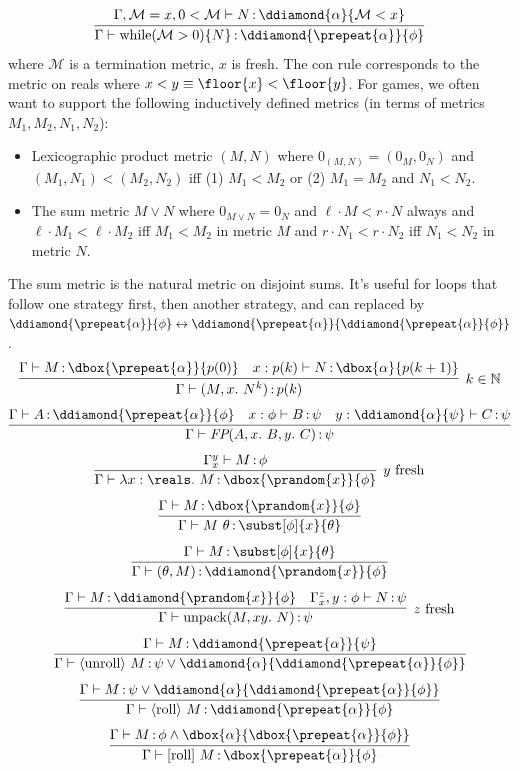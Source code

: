 \documentclass[12pt]{cmuthesis}
\theoremstyle{definition}
\theoremstyle{remark}
\newcommand{\lequiv}{\leftrightarrow}
\begin{document}
\[\infer{\proves{\G}{\ewhile{\mathcal{M}}{N}}{\ddiamond{\prepeat{\alpha}}{\phi}}}
        {\proves{\G,\mathcal{M}=x,0<\mathcal{M}}{N}{\ddiamond{\alpha}{\mathcal{M}<x}}}\]
where $\mathcal{M}$ is a termination metric, $x$ is fresh.
The con rule corresponds to the metric on reals where $x < y \equiv \floor{x} < \floor{y}$.
For games, we often want to support the following inductively defined metrics (in terms of metrics $M_1, M_2, N_1, N_2$):
\begin{itemize}
\item Lexicographic product metric $(M,N)$ where $0_{(M,N)}=(0_M,0_N)$ and $(M_1,N_1) < (M_2,N_2)$ iff (1) $M_1 < M_2$ or (2) $M_1 = M_2$ and $N_1 < N_2$.
\item The sum metric $M \lor N$ where  $0_{M \lor N} = 0_N$ and $\ell\cdot M < r\cdot N$ always and $\ell\cdot M_1 <\ell \cdot M_2$ iff $M_1 < M_2$ in metric $M$ and $r\cdot N_1 < r\cdot N_2$ iff $N_1 < N_2$ in metric $N$.
\end{itemize}
The sum metric is the natural metric on disjoint sums.
It's useful for loops that follow one strategy first, then another strategy, and can replaced by $\ddiamond{\prepeat{\alpha}}{\phi} \lequiv \ddiamond{\prepeat{\alpha}}{\ddiamond{\prepeat{\alpha}}{\phi}}$.
\[\infer[k \in \mathbb{N}]{\proves{\G}{\eloopelim{M}{N}{k}}{p(k)}}
        {\proves{\G}{M}{\dbox{\prepeat{\alpha}}{p(0)}}
        &\proves{x:p(k)}{N}{\dbox{\alpha}{p(k+1)}}}\]
\[\infer{\proves{\G}{\efp{A}{B}{C}}{\psi}}
        {\proves{\G}{A}{\ddiamond{\prepeat{\alpha}}{\phi}} 
        &\proves{x:\phi}{B}{\psi} & \proves{y:\ddiamond{\alpha}{\psi}}{C}{\psi}}\]
\[\infer[y\text{ fresh}]{\proves{\G}{\elam{\reals}{M}}{\dbox{\prandom{x}}{\phi}}}
        {\proves{\G_x^y}{M}{\phi}}\]
\[\infer{\proves{\G}{\eapp{M}{\theta}}{\subst[\phi]{x}{\theta}}}
        {\proves{\G}{M}{\dbox{\prandom{x}}{\phi}}}\]
\[\infer{\proves{\G}{\etcons{\theta}{M}}{\ddiamond{\prandom{x}}{\phi}}}
        {\proves{\G}{M}{\subst[\phi]{x}{\theta}}}\]
\[\infer[z\text{ fresh}]{\proves{\G}{\eunpack{M}{N}}{\psi}}
        {\proves{\G}{M}{\ddiamond{\prandom{x}}{\phi}} & \proves{\G_x^z,y:\phi}{N}{\psi}}\]
\[\infer{\proves{\G}{\edunroll{M}}{\psi \lor \ddiamond{\alpha}{\ddiamond{\prepeat{\alpha}}{\phi}}}}
        {\proves{\G}{M}{\ddiamond{\prepeat{\alpha}}{\psi}}}\]
\[\infer{\proves{\G}{\edroll{M}}{\ddiamond{\prepeat{\alpha}}{\phi}}}
        {\proves{\G}{M}{\psi \lor \ddiamond{\alpha}{\ddiamond{\prepeat{\alpha}}{\phi}}}}\]
\[\infer{\proves{\G}{\ebroll{M}}{\dbox{\prepeat{\alpha}}{\phi}}}
        {\proves{\G}{M}{\phi \land \dbox{\alpha}{\dbox{\prepeat{\alpha}}{\phi}}}}\]
\end{document}
